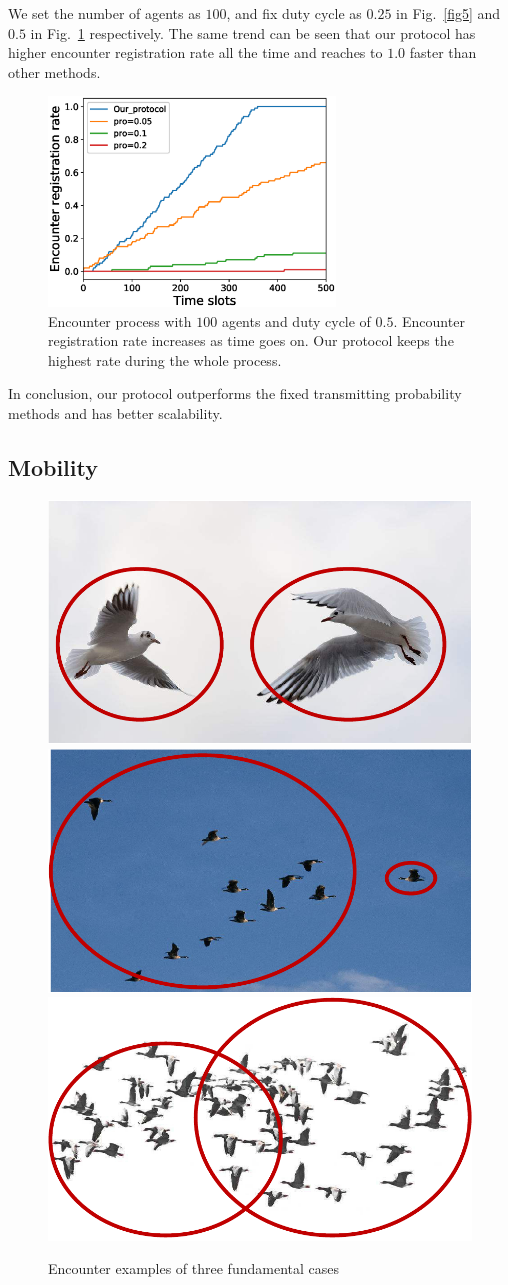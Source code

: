 We set the number of agents as $100$, and fix
duty cycle as $0.25$ in Fig.~\ref{fig5} and $0.5$ in Fig.~\ref{fig6} respectively.
The same trend can be seen that our protocol has higher encounter registration rate
all the time and reaches to $1.0$ faster than other methods.

\begin{figure}[!h]
    \centering
    \includegraphics[width=3in]{figures/figure6.eps}
    \caption{Encounter process with $100$ agents and duty cycle of $0.5$. 
    Encounter registration rate increases as time goes on. Our protocol keeps
    the highest rate during the whole process.}
    \label{fig6}
\end{figure}


In conclusion, our protocol outperforms the fixed transmitting probability methods 
and has better scalability. 


\subsection{Mobility}

\begin{figure}[!t]
    \includegraphics[width=.32\textwidth]{figures/AtoA}
    \includegraphics[width=.32\textwidth]{figures/AtoG}
    \includegraphics[width=.32\textwidth]{figures/GtoG}
    \caption{Encounter examples of three fundamental cases}
    \label{examples}
\end{figure}

